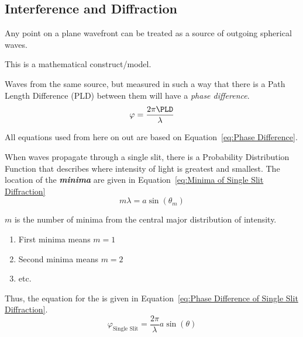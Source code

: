 	\subsection*{Interference and Diffraction} \label{subsec:Interference and Diffraction}
		\begin{definition} \label{def:Huygen's Principle}
			Any point on a plane wavefront can be treated as a source of outgoing spherical waves.
			\begin{note}
				This is a mathematical construct/model.
			\end{note}
		\end{definition}
		\begin{definition} \label{def:Phase Difference}
			Waves from the same source, but measured in such a way that there is a Path Length Difference (PLD) between them will have a \emph{phase difference}.
			\begin{equation} \label{eq:Phase Difference}
				\varphi = \frac{2 \pi \PLD}{\lambda}
			\end{equation}
		\end{definition}
	All  equations used from here on out are based on Equation~\eqref{eq:Phase Difference}.
		\begin{definition} \label{def:Single Slit Diffraction}
			When waves propagate through a single slit, there is a Probability Distribution Function that describes where intensity of light is greatest and smallest.
			The location of the \emph{\textbf{minima}} are given in Equation~\eqref{eq:Minima of Single Slit Diffraction}
			\begin{equation} \label{eq:Minima of Single Slit Diffraction}
				m \lambda = a \sin \left( \theta_{m} \right)
			\end{equation}
			\begin{note}
				$m$ is the number of minima from the central major distribution of intensity.
				\begin{enumerate}
					\item First minima means $m=1$
					\item Second minima means $m=2$
					\item etc.
				\end{enumerate}
			\end{note}
			Thus, the equation for the  is given in Equation~\eqref{eq:Phase Difference of Single Slit Diffraction}.
			\begin{equation} \label{eq:Phase Difference of Single Slit Diffraction}
				\varphi_{\text{Single Slit}} = \frac{2 \pi}{\lambda} a \sin \left( \theta \right)
			\end{equation}
		\end{definition}
